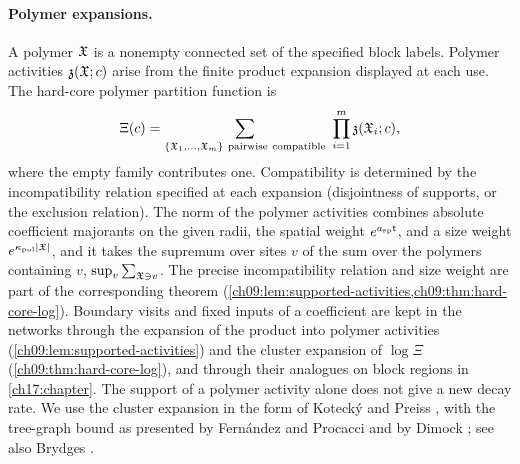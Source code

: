 \paragraph{Polymer expansions.}
A polymer $\mathfrak X$ is a nonempty connected set of the specified block labels. Polymer activities $\mathfrak z(\mathfrak X;c)$ arise from the finite product expansion displayed at each use. The hard-core polymer partition function is
\[
 \Xi(c)=\sum_{\{\Polymer_1,\dots,\Polymer_m\}\ \mathrm{pairwise\ compatible}}\ \prod_{i=1}^m\Activity(\Polymer_i;c),
\]
where the empty family contributes one. Compatibility is determined by the incompatibility relation specified at each expansion (disjointness of supports, or the exclusion relation). The norm of the polymer activities combines absolute coefficient majorants on the given radii, the spatial weight $e^{a_{\mathrm{sp}}\mathsf t}$, and a size weight $e^{\kappa_{\mathrm{pol}}\lvert \mathfrak X\rvert}$, and it takes the supremum over sites $v$ of the sum over the polymers containing $v$, $\sup_v\sum_{\mathfrak X\ni v}$. The precise incompatibility relation and size weight are part of the corresponding theorem (\cref{ch09:lem:supported-activities,ch09:thm:hard-core-log}). Boundary visits and fixed inputs of a coefficient are kept in the networks through the expansion of the product into polymer activities (\cref{ch09:lem:supported-activities}) and the cluster expansion of $\log\Xi$ (\cref{ch09:thm:hard-core-log}), and through their analogues on block regions in \cref{ch17:chapter}. The support of a polymer activity alone does not give a new decay rate. We use the cluster expansion in the form of Kotecký and Preiss \cite{KoteckyPreiss1986}, with the tree-graph bound as presented by Fernández and Procacci \cite{FernandezProcacci2007} and by Dimock \cite[Appendix~B, Theorem~27, p.~39, and (323), p.~42]{Dimock2013v2}; see also Brydges \cite{Brydges1986}.

